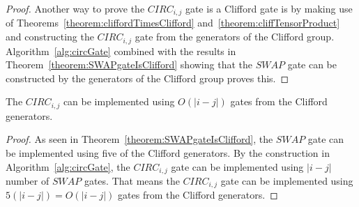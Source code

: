 \begin{proof}
Another way to prove the $\mathit{CIRC}_{i,j}$ gate is a Clifford gate is by making use of Theorems~\ref{theorem:cliffordTimesClifford} and~\ref{theorem:cliffTensorProduct} and constructing the $\mathit{CIRC}_{i,j}$ gate from the generators of the Clifford group. Algorithm~\ref{alg:circGate} combined with the results in Theorem~\ref{theorem:SWAPgateIsClifford} showing that the $\mathit{SWAP}$ gate can be constructed by the generators of the Clifford group proves this.
\end{proof}

\begin{corollary}
\label{corollary:circGateCount}
The $\mathit{CIRC}_{i,j}$ can be implemented using $O\left(\lvert i - j \rvert \right)$ gates from the Clifford generators.
\end{corollary}
\begin{proof}
As seen in Theorem~\ref{theorem:SWAPgateIsClifford}, the $\mathit{SWAP}$ gate can be implemented using five of the Clifford generators. By the construction in Algorithm~\ref{alg:circGate}, the $\mathit{CIRC}_{i,j}$ gate can be implemented using $\lvert i - j \rvert$ number of $\mathit{SWAP}$ gates. That means the $\mathit{CIRC}_{i,j}$ gate can be implemented using $5(\lvert i - j \rvert) = O\left(\lvert i - j \rvert \right)$ gates from the Clifford generators.
\end{proof}


